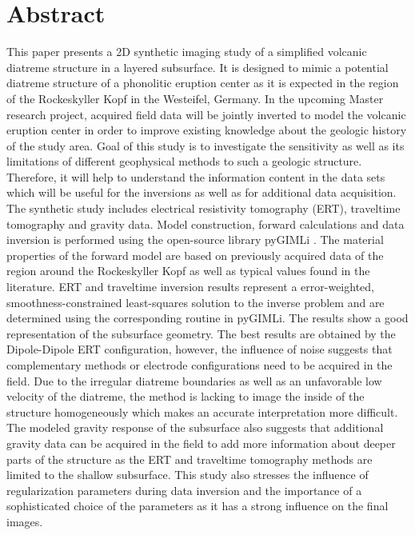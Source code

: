 \section*{Abstract}

This paper presents a 2D synthetic imaging study of a simplified volcanic diatreme structure in a layered subsurface. It is designed to mimic a potential diatreme structure of a phonolitic eruption center as it is expected in the region of the Rockeskyller Kopf in the Westeifel, Germany. In the upcoming Master research project, acquired field data will be jointly inverted to model the volcanic eruption center in order to improve existing knowledge about the geologic history of the study area. Goal of this study is to investigate the sensitivity as well as its limitations of different geophysical methods to such a geologic structure. Therefore, it will help to understand the information content in the data sets which will be useful for the inversions as well as for additional data acquisition. The synthetic study includes electrical resistivity tomography (ERT), traveltime tomography and gravity data. Model construction, forward calculations and data inversion is performed using the open-source library pyGIMLi \citep{Ruecker2017}. The material properties of the forward model are based on previously acquired data of the region around the Rockeskyller Kopf as well as typical values found in the literature. ERT and traveltime inversion results represent a error-weighted, smoothness-constrained least-squares solution to the inverse problem and are determined using the corresponding routine in pyGIMLi. The results show a good representation of the subsurface geometry. The best results are obtained by the Dipole-Dipole ERT configuration, however, the influence of noise suggests that complementary methods or electrode configurations need to be acquired in the field. Due to the irregular diatreme boundaries as well as an unfavorable low velocity of the diatreme, the method is lacking to image the inside of the structure homogeneously which makes an accurate interpretation more difficult. The modeled gravity response of the subsurface also suggests that additional gravity data can be acquired in the field to add more information about deeper parts of the structure as the ERT and traveltime tomography methods are limited to the shallow subsurface. This study also stresses the influence of regularization parameters during data inversion and the importance of a sophisticated choice of the parameters as it has a strong influence on the final images.